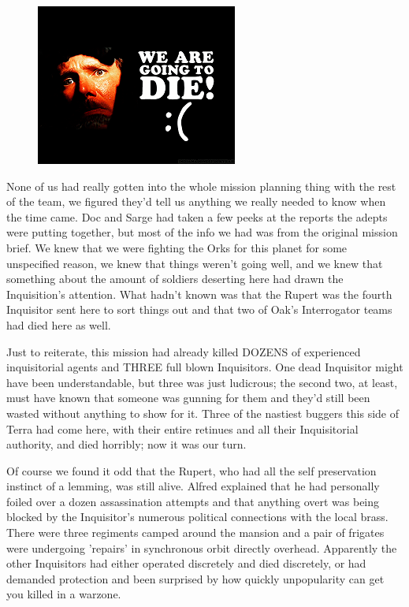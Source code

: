 \begin{figure}
	\begin{center}
		\includegraphics[width=\figwidth]{pics/9/11.png}
	\end{center}
\end{figure}
None of us had really gotten into the whole mission planning thing with the rest of the team, we figured they'd tell us anything we really needed to know when the time came. 
Doc and Sarge had taken a few peeks at the reports the adepts were putting together, but most of the info we had was from the original mission brief. 
We knew that we were fighting the Orks for this planet for some unspecified reason, we knew that things weren't going well, and we knew that something about the amount of soldiers deserting here had drawn the Inquisition's attention. 
What hadn't known was that the Rupert was the fourth Inquisitor sent here to sort things out and that two of Oak's Interrogator teams had died here as well.

Just to reiterate, this mission had already killed DOZENS of experienced inquisitorial agents and THREE full blown Inquisitors. 
One dead Inquisitor might have been understandable, but three was just ludicrous; 
the second two, at least, must have known that someone was gunning for them and they'd still been wasted without anything to show for it. 
Three of the nastiest buggers this side of Terra had come here, with their entire retinues and all their Inquisitorial authority, and died horribly; 
now it was our turn.

Of course we found it odd that the Rupert, who had all the self preservation instinct of a lemming, was still alive. 
Alfred explained that he had personally foiled over a dozen assassination attempts and that anything overt was being blocked by the Inquisitor's numerous political connections with the local brass. 
There were three regiments camped around the mansion and a pair of frigates were undergoing 'repairs' in synchronous orbit directly overhead. 
Apparently the other Inquisitors had either operated discretely and died discretely, or had demanded protection and been surprised by how quickly unpopularity can get you killed in a warzone.

